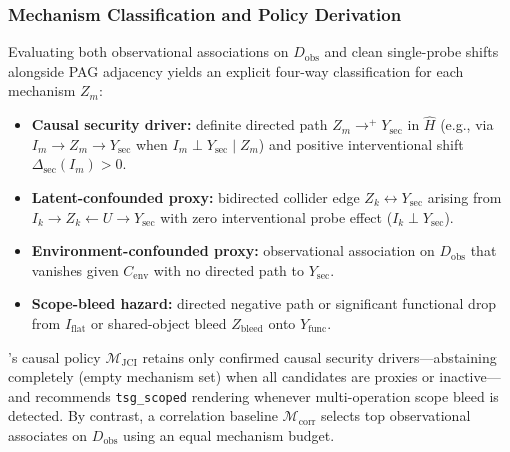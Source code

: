 \subsubsection{Mechanism Classification and Policy Derivation}
Evaluating both observational associations on $D_{\mathrm{obs}}$ and clean
single-probe shifts alongside PAG adjacency yields an explicit four-way
classification for each mechanism $Z_m$:
\begin{itemize}
  \item \textbf{Causal security driver:} definite directed path
  $Z_m \to^+ Y_{\mathrm{sec}}$ in $\widehat{H}$ (e.g., via $I_m \to Z_m \to
  Y_{\mathrm{sec}}$ when $I_m \perp Y_{\mathrm{sec}} \mid Z_m$) and positive
  interventional shift $\Delta_{\mathrm{sec}}(I_m) > 0$.
  \item \textbf{Latent-confounded proxy:} bidirected collider edge
  $Z_k \leftrightarrow Y_{\mathrm{sec}}$ arising from $I_k \to Z_k \leftarrow U
  \to Y_{\mathrm{sec}}$ with zero interventional probe effect ($I_k \perp Y_{\mathrm{sec}}$).
  \item \textbf{Environment-confounded proxy:} observational association on
  $D_{\mathrm{obs}}$ that vanishes given $C_{\mathrm{env}}$ with no directed path
  to $Y_{\mathrm{sec}}$.
  \item \textbf{Scope-bleed hazard:} directed negative path or significant
  functional drop from $I_{\mathrm{flat}}$ or shared-object bleed $Z_{\mathrm{bleed}}$
  onto $Y_{\mathrm{func}}$.
\end{itemize}
\model's causal policy $\mathcal{M}_{\mathrm{JCI}}$ retains only confirmed
causal security drivers---abstaining completely (empty mechanism set) when all
candidates are proxies or inactive---and recommends \texttt{tsg\_scoped}
rendering whenever multi-operation scope bleed is detected. By contrast, a
correlation baseline $\mathcal{M}_{\mathrm{corr}}$ selects top observational
associates on $D_{\mathrm{obs}}$ using an equal mechanism budget.

